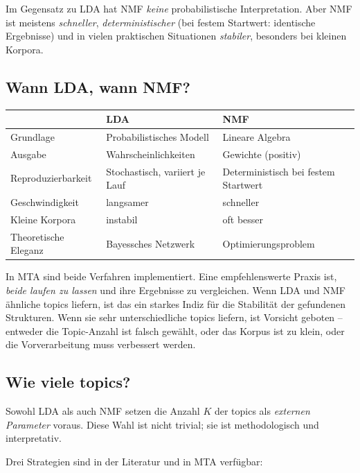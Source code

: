 \documentclass[a4paper,11pt]{article}
\begin{document}
Im Gegensatz zu LDA hat NMF \emph{keine} probabilistische Interpretation.
Aber NMF ist meistens \emph{schneller}, \emph{deterministischer}
(bei festem Startwert: identische Ergebnisse) und in vielen praktischen
Situationen \emph{stabiler}, besonders bei kleinen Korpora.

\subsection{Wann LDA, wann NMF?}

\begin{tabularx}{\textwidth}{@{}p{}XX@{}}
\toprule
& \textbf{LDA} & \textbf{NMF} \\
\midrule
Grundlage
  & Probabilistisches Modell
  & Lineare Algebra \\
\addlinespace[3pt]
Ausgabe
  & Wahrscheinlichkeiten
  & Gewichte (positiv) \\
\addlinespace[3pt]
Reproduzierbarkeit
  & Stochastisch, variiert je Lauf
  & Deterministisch bei festem Startwert \\
\addlinespace[3pt]
Geschwindigkeit
  & langsamer
  & schneller \\
\addlinespace[3pt]
Kleine Korpora
  & instabil
  & oft besser \\
\addlinespace[3pt]
Theoretische Eleganz
  & Bayessches Netzwerk
  & Optimierungsproblem \\
\bottomrule
\end{tabularx}

In MTA sind beide Verfahren implementiert. Eine empfehlenswerte
Praxis ist, \emph{beide laufen zu lassen} und ihre Ergebnisse zu
vergleichen. Wenn LDA und NMF ähnliche topics liefern, ist das ein
starkes Indiz für die Stabilität der gefundenen Strukturen. Wenn sie
sehr unterschiedliche topics liefern, ist Vorsicht geboten -- entweder
die Topic-Anzahl ist falsch gewählt, oder das Korpus ist zu klein, oder
die Vorverarbeitung muss verbessert werden.

\subsection{Wie viele topics?}

Sowohl LDA als auch NMF setzen die Anzahl $K$ der topics als
\emph{externen Parameter} voraus. Diese Wahl ist nicht trivial; sie
ist methodologisch und interpretativ.

Drei Strategien sind in der Literatur und in MTA verfügbar:
\end{document}
